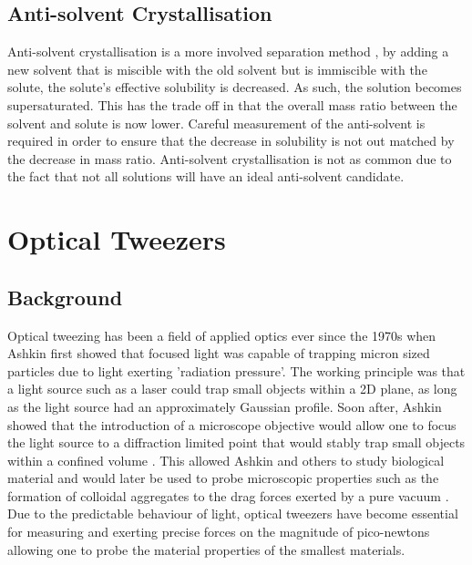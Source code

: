 \subsection{Anti-solvent Crystallisation} 
Anti-solvent crystallisation is a more involved separation method ,
by adding a new solvent that is miscible with the old solvent but is 
immiscible with the solute, the solute's effective solubility is decreased.
As such, the solution becomes supersaturated. This has the trade off in that the overall mass ratio between the solvent and solute is now lower. Careful
measurement of the anti-solvent is required in order to ensure that the 
decrease in solubility is not out matched by the decrease in mass ratio.
Anti-solvent crystallisation is not as common due to the fact that not all
solutions will have an ideal anti-solvent candidate.



\section{Optical Tweezers}
\subsection{Background}
Optical tweezing has been a field of applied optics ever since the 1970s
when Ashkin \cite{Ashkin1970} first showed that focused light was capable 
of trapping micron sized particles due to light exerting 'radiation pressure'. 
The working principle was that a light source such as a laser could trap 
small objects within a 2D plane, as long as the light source had an 
approximately Gaussian profile. Soon after, Ashkin showed that the introduction 
of a microscope objective would allow one to focus the light source to a 
diffraction limited point that would stably trap small objects within a 
confined volume \cite{Ashkin1980}. This allowed Ashkin and others to study 
biological material and would later be used to probe microscopic properties 
such as the formation of colloidal aggregates \cite{Yi2021} to the drag 
forces exerted by a pure vacuum \cite{Ahn2018, Monteiro2018}. Due to the 
predictable behaviour of light, optical tweezers have become essential for 
measuring and exerting precise forces on the magnitude of pico-newtons 
allowing one to probe the material properties of the smallest materials. 

